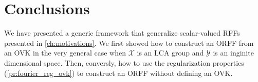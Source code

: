 
\section{Conclusions}
\label{sec:conclusions_construction} We have presented a generic framework that
generalize scalar-valued \acsp{RFF} presented in \cref{ch:motivations}.  We
first showed how to construct an \acs{ORFF} from an \acs{OVK} in the very
general case when $\mathcal{X}$ is an \acs{LCA} group and $\mathcal{Y}$ is an
inginite dimensional space. Then, conversly, how to use the regularization
properties (\cref{pr:fourier_reg_ovk}) to construct an \acs{ORFF}
without defining an \acs{OVK}. 

\chapterend
